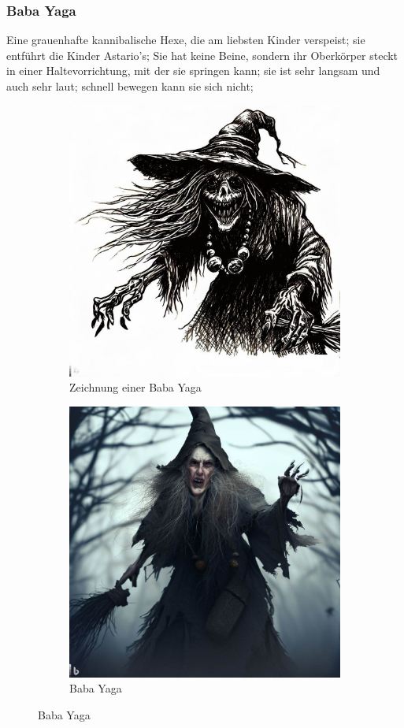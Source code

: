 \documentclass[11pt, twoside]{article}
\begin{document}
\subsubsection{Baba Yaga\label{baba}}
\label{sec:org0097ab0}
Eine grauenhafte kannibalische Hexe, die am liebsten Kinder verspeist; sie entführt die Kinder Astario’s; Sie hat keine Beine, sondern ihr Oberkörper steckt in einer Haltevorrichtung, mit der sie springen kann; sie ist sehr langsam und auch sehr laut; schnell bewegen kann sie sich nicht;
\begin{figure}[H]
\centering
\caption{Baba Yaga}
\label{fig:baba}
  \begin{subfigure}{0.5\textwidth}
    \centering
    \includegraphics[width=0.8\linewidth]{baba1.jpeg}
    \caption{Zeichnung einer Baba Yaga}
  \end{subfigure}%
  \begin{subfigure}{0.5\textwidth}
    \centering
    \includegraphics[width=0.8\linewidth]{baba2.jpeg}
    \caption{Baba Yaga}
  \end{subfigure}
\end{figure}
\end{document}
